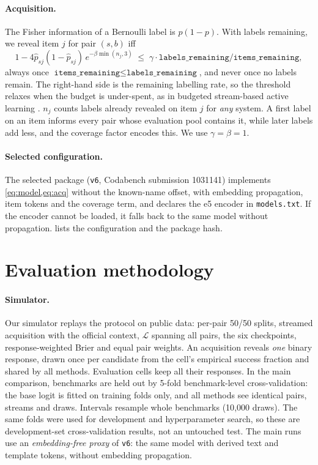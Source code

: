 \documentclass{article}
\newcommand{\Lb}{\mathcal{L}}
\begin{document}
\paragraph{Acquisition.}
The Fisher information of a Bernoulli label is $p(1-p)$. With labels remaining, we reveal item $j$ for pair $(s,b)$ iff
\begin{equation}\label{eq:acq}
  1 - 4\hat p_{sj}(1-\hat p_{sj})\,e^{-\beta\min(n_j,3)} \;\le\; \gamma\cdot \texttt{labels\_remaining}/\texttt{items\_remaining},
\end{equation}
always once $\texttt{items\_remaining}\le\texttt{labels\_remaining}$, and never once no labels remain. The right-hand side is the remaining labelling rate, so the threshold relaxes when the budget is under-spent, as in budgeted stream-based active learning \citep{fujii2016budgeted}.
$n_j$ counts labels already revealed on item $j$ for \emph{any} system. A first label on an item informs every pair whose evaluation pool contains it, while later labels add less, and the coverage factor encodes this. We use $\gamma=\beta=1$.

\paragraph{Selected configuration.}
The selected package (\texttt{v6}, Codabench submission 1031141) implements \cref{eq:model,eq:acq} without the known-name offset, with embedding propagation, item tokens and the coverage term, and declares the e5 encoder in \texttt{models.txt}. If the encoder cannot be loaded, it falls back to the same model without propagation.  lists the configuration and the package hash.

\section{Evaluation methodology}\label{sec:validation}
\paragraph{Simulator.}
Our simulator replays the protocol on public data: per-pair 50/50 splits, streamed acquisition with the official context, $\Lb$ spanning all pairs, the six checkpoints, response-weighted Brier and equal pair weights.
An acquisition reveals \emph{one} binary response, drawn once per candidate from the cell's empirical success fraction and shared by all methods. Evaluation cells keep all their responses.
In the main comparison, benchmarks are held out by 5-fold benchmark-level cross-validation: the base logit is fitted on training folds only, and all methods see identical pairs, streams and draws. Intervals resample whole benchmarks (10{,}000 draws).
The same folds were used for development and hyperparameter search, so these are development-set cross-validation results, not an untouched test.
The main runs use an \emph{embedding-free proxy} of \texttt{v6}: the same model with derived text and template tokens, without embedding propagation.
\end{document}
